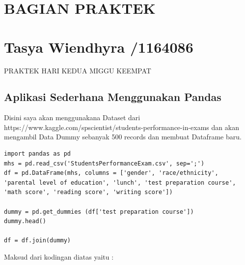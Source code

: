 \section{BAGIAN PRAKTEK}
\section{Tasya Wiendhyra /1164086}
PRAKTEK HARI KEDUA MIGGU KEEMPAT

\subsection{Aplikasi Sederhana Menggunakan Pandas}
Disini saya akan menggunakana Dataset dari https://www.kaggle.com/spscientist/students-performance-in-exams dan akan mengambil Data Dummy sebanyak 500 records dan membuat Dataframe baru.
\begin{verbatim}
import pandas as pd
mhs = pd.read_csv('StudentsPerformanceExam.csv', sep=';')
df = pd.DataFrame(mhs, columns = ['gender', 'race/ethnicity', 'parental level of education', 'lunch', 'test preparation course', 'math score', 'reading score', 'writing score']) 

dummy = pd.get_dummies (df['test preparation course'])
dummy.head()
 
df = df.join(dummy)
\end{verbatim}
Maksud dari kodingan diatas yaitu :
